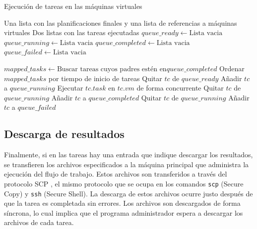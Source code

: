 \begin{algorithm}
\caption{Ejecuci\'on de tareas en las m\'aquinas virtuales}
\label{alg_manage_execution}
\begin{algorithmic}
\Require Una lista con las planificaciones finales y una lista de referencias a m\'aquinas virtuales
\Ensure Dos listas con las tareas ejecutadas
    \State $queue\_ready \gets \text{Lista vacia}$
    \State $queue\_running \gets \text{Lista vacia}$
    \State $queue\_completed \gets \text{Lista vacia}$
    \State $queue\_failed \gets \text{Lista vacia}$

    \EndFor

        \State $mapped\_tasks \gets \text{Buscar tareas cuyos padres est\'en en} queue\_completed$
        \State Ordenar $mapped\_tasks$ por tiempo de inicio de tareas
            \State Quitar $tc$ de $queue\_ready$
            \State Añadir $tc$ a $queue\_running$
            \State Ejecutar $tc.task$ en $tc.vm$ de forma concurrente
        \EndFor
                \State Quitar $tc$ de $queue\_running$
                \State Añadir $tc$ a $queue\_completed$
                \State Quitar $tc$ de $queue\_running$
                \State Añadir $tc$ a $queue\_failed$
            \EndIf
        \EndFor
    \EndWhile
\EndProcedure
\end{algorithmic}
\end{algorithm}


\subsection{Descarga de resultados}

Finalmente, si en las tareas hay una entrada que indique descargar los resultados, se transfieren los archivos especificados a la máquina principal que administra la ejecuci\'on del flujo de trabajo. Estos archivos son transferidos a trav\'es del protocolo SCP \cite{rfc4251}, el mismo protocolo que se ocupa en los comandos \texttt{scp} (Secure Copy) y \texttt{ssh} (Secure Shell). La descarga de estos archivos ocurre justo despu\'es de que la tarea es completada sin errores. Los archivos son descargados de forma s\'incrona, lo cual implica que el programa administrador espera a descargar los archivos de cada tarea.


